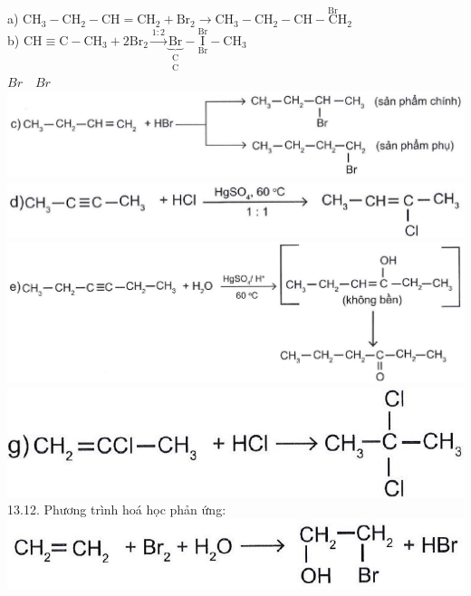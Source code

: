 \documentclass[10pt]{article}
\begin{document}
a) $\mathrm{CH}_{3}-\mathrm{CH}_{2}-\mathrm{CH}=\mathrm{CH}_{2}+\mathrm{Br}_{2} \longrightarrow \mathrm{CH}_{3}-\mathrm{CH}_{2}-\mathrm{CH}-\stackrel{\mathrm{Br}}{\mathrm{C}} \mathrm{H}_{2}$\\
b) $\mathrm{CH} \equiv \mathrm{C}-\mathrm{CH}_{3}+2 \mathrm{Br}_{2} \xrightarrow{1: 2} \underbrace{\mathrm{Br}}_{\substack{\mathrm{C} \\ \mathrm{C}}}-\stackrel{\mathrm{Br}}{\underset{\mathrm{Br}}{\mathrm{I}}}-\mathrm{CH}_{3}$\\
$B r \quad B r$\\
\includegraphics[max width=\textwidth, center]{2025_10_23_adad5b98d65ac6665838g-22(3)}\\
\includegraphics[max width=\textwidth, center]{2025_10_23_adad5b98d65ac6665838g-22(2)}\\
\includegraphics[max width=\textwidth, center]{2025_10_23_adad5b98d65ac6665838g-22(4)}\\
\includegraphics[max width=\textwidth, center]{2025_10_23_adad5b98d65ac6665838g-22(1)}\\
13.12. Phương trình hoá học phản ứng:\\
\includegraphics[max width=\textwidth, center]{2025_10_23_adad5b98d65ac6665838g-22}\\
\end{document}
